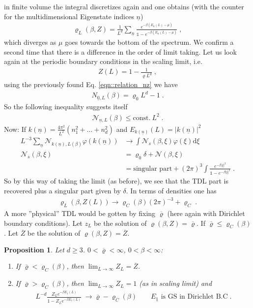 \documentclass[
a4paper, %
11pt, %
onecolumn, %
openany, %
]{memoir}
\theoremstyle{definition}
\theoremstyle{remark}
\theoremstyle{plain}
\newtheorem{prop}[definition]{Proposition}
\begin{document}
in finite volume the integral discretizes again and one obtains (with the counter for the multidimensional Eigenstate indices $\underline{n}$)\begin{align}
\varrho_{L}(\beta,Z)=\frac{1}{L^d}\sum_{\underline{n}}\frac{e^{-\beta(E_{\underline{n}}(L)-\mu)}}{\mathds{1}-e^{-\beta(E_{\underline{n}}(L)-\mu)}}\; ,
\end{align}
which diverges as $\mu$ goes towards the bottom of the spectrum. We confirm a second time that there is a difference in the order of limit taking. Let us look again at the periodic boundary conditions in the scaling limit, i.e. \begin{align}
Z(L)=1-\frac{1}{\varrho L^d}\; ,
\end{align}
using the previously found Eq. \eqref{eqn::relation_nz} we have \begin{align}
N_{\underline{0},L}(\beta)=\varrho_0L^d-1\; .
\end{align}
So the following inequality suggests itself \begin{align}
\mathcal{N}_{\underline{n},L}(\beta)\leq \mathrm{const.}~L^2\; .
\end{align}
Now: If $k(\underline{n})=\frac{4\pi^2}{L^2}(n_1^2+\ldots+n_d^2)$ and $E_{k(\underline{n})}(L)=|k(\underline{n})|^2$ \begin{align}
L^{-3}\sum_{\underline{n}}\mathcal{N}_{k(\underline{n}),L(\beta)}\varphi(k(\underline{n}))&\longrightarrow \int\mathcal{N}_s(\beta,\xi)\varphi(\xi)\mathrm{d}\xi\\
\mathcal{N}_s(\beta,\xi)&=\varrho_0\delta+\mathcal{N}(\beta,\xi)\\
&=\text{singular part} + (2\pi)^3\int\frac{e^{-\beta|\xi|^2}}{\mathds{1}-e^{-\beta|\xi|^2}}\;.
\end{align}
So by this way of taking the limit (as before), we see that the TDL part is recovered plus a singular part given by $\delta$. In terms of densities one has \begin{align}
\varrho_L(\beta,Z(L))\rightarrow\varrho_C(\beta)(2\pi)^{-3}+\varrho_C\; .
\end{align}
A more ''physical'' TDL would be gotten by fixing $\overline{\varrho}$ (here again with Dirichlet boundary conditions). Let $z_L$ be the solution of $\varrho(\beta,Z)=\overline{\varrho}$. If $\overline{\varrho}\leq \varrho_C(\beta)$. Let $\overline{Z}$ be the solution of $\varrho(\beta,Z)=\overline{Z}$. \begin{prop}
	Let $d\geq 3$. $0<\overline{\varrho}<\infty$, $0<\beta<\infty$: \begin{enumerate}
		\item If $\overline{\varrho}<\varrho_C(\beta)$, then $\lim_{L\rightarrow\infty}Z_L=\overline{Z}$.
		\item If $\overline{\varrho}>\varrho_C(\beta)$, then $\lim_{L\rightarrow\infty}Z_L=1$ (as in scaling limit) and \begin{align}
		L^{-d}\frac{Z_Le^{-\beta E_{\underline{1}}(L)}}{1-Z_Le^{-\beta E_{\underline{1}}(L)}}\; \longrightarrow \overline{\varrho}-\varrho_C(\beta)\qquad E_{\underline{1}}\text{ is GS in Dirichlet B.C}\; .
		\end{align}
	\end{enumerate}
\end{prop}
\end{document}

